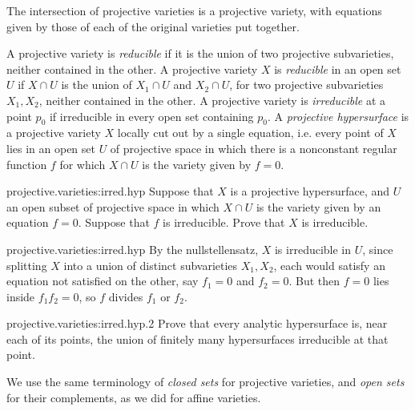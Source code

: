 \begin{example}
The intersection of projective varieties is a projective variety, with equations given by those of each of the original varieties put together.
\end{example}
A projective variety is \emph{reducible} if it is the union of two projective subvarieties, neither contained in the other.
A projective variety \(X\) is \emph{reducible} in an open set \(U\) if \(X\cap U\) is the union of \(X_1\cap U\) and \(X_2\cap U\), for two projective subvarieties \(X_1,X_2\), neither contained in the other.
A projective variety is \emph{irreducible} at a point \(p_0\) if irreducible in every open set containing \(p_0\).
A \emph{projective hypersurface} is a projective variety \(X\) locally cut out by a single equation, i.e. every point of \(X\) lies in an open set \(U\) of projective space in which there is a nonconstant regular function \(f\) for which \(X\cap U\) is the variety given by \(f=0\).
\begin{problem}{projective.varieties:irred.hyp}
Suppose that \(X\) is a projective hypersurface, and \(U\) an open subset of projective space in which \(X\cap U\) is the variety given by an equation \(f=0\).
Suppose that \(f\) is irreducible.
Prove that \(X\) is irreducible.
\end{problem}
\begin{answer}{projective.varieties:irred.hyp}
By the nullstellensatz, \(X\) is irreducible in \(U\), since splitting \(X\) into a union of distinct subvarieties \(X_1,X_2\), each would satisfy an equation not satisfied on the other, say \(f_1=0\) and \(f_2=0\).
But then \(f=0\) lies inside \(f_1f_2=0\), so \(f\) divides \(f_1\) or \(f_2\).
\end{answer}
\begin{problem}{projective.varieties:irred.hyp.2}
Prove that every analytic hypersurface is, near each of its points, the union of finitely many  hypersurfaces irreducible at that point.
\end{problem}
We use the same terminology of \emph{closed sets} for projective varieties, and \emph{open sets} for their complements, as we did for affine varieties.

